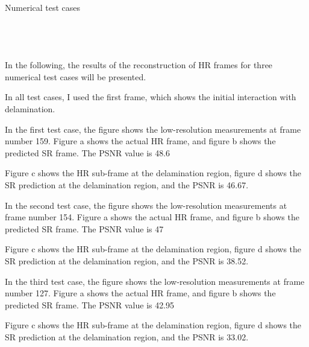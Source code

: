 \documentclass[10pt,aspectratio=169,dvipsnames]{beamer} %
\begin{document}
\begin{frame}{Numerical test cases}
\begin{columns}[T]
\begin{column}[c]{0.5\textwidth}
{\begin{figure}
						\quad
						\\
						\quad	
					\end{figure}}
			\end{column}
		\end{columns}
	\end{frame}
	\note
	{
		\tiny
		In the following, the results of the reconstruction of HR frames for three numerical test cases will be presented.
		
		In all test cases, I used the first frame, which shows the initial interaction with delamination.
		
		In the first test case, the figure shows the low-resolution measurements at frame number 159.
		Figure a shows the actual HR frame, and figure b shows the predicted SR frame. 
		The PSNR value is 48.6
		
		Figure c shows the HR sub-frame at the delamination region, figure d shows the SR prediction at the delamination region, and the PSNR is 46.67.					
		
		In the second test case, the figure shows the low-resolution measurements at frame number 154.		
		Figure a shows the actual HR frame, and figure b shows the predicted SR frame. 
		The PSNR value is 47
		
		Figure c shows the HR sub-frame at the delamination region, figure d shows the SR prediction at the delamination region, and the PSNR is 38.52.
		
		In the third test case, the figure shows the low-resolution measurements at frame number 127.
		Figure a shows the actual HR frame, and figure b shows the predicted SR frame. 
		The PSNR value is 42.95
		
		Figure c shows the HR sub-frame at the delamination region, figure d shows the SR prediction at the delamination region, and the PSNR is 33.02.
		
			
	}
\end{document}
